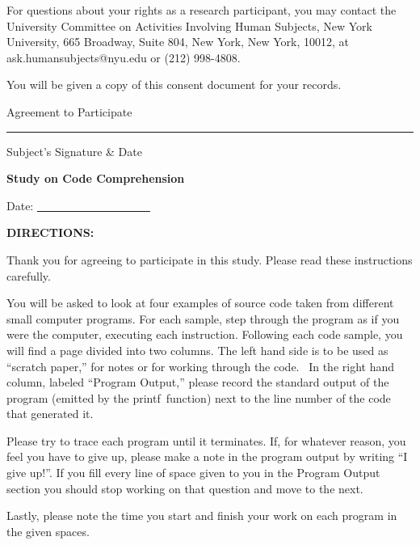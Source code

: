 \documentclass[12pt, a4paper, oneside]{article}
\begin{document}
For questions about your rights as a research participant, you may
contact the University Committee on Activities Involving Human Subjects,
New York University, 665 Broadway, Suite 804, New York, New York, 10012,
at ask.humansubjects@nyu.edu or (212) 998-4808.

You will be given a copy of this consent document for your records.

\vspace{20pt}

Agreement to Participate

\vspace{20pt}

\rule{0.7\linewidth}{\linethickness}

Subject's Signature \& Date

\pagebreak

\begin{center}\textbf{Study on Code Comprehension}\end{center}

\vspace{20pt}

Date: \underline{~~~~~~~~~~~~~~~~~~~~}

\vspace{20pt}

\textbf{DIRECTIONS:}

{Thank you for agreeing to participate in this study. Please read these
instructions carefully.}

{You will be asked to look at four examples of source code taken from
different small computer programs. For each sample, }{step through the
program as if you were the computer, executing each instruction.
Following each code sample, you will find a page divided into two
columns. The left hand side is to be used as ``scratch paper,'' for
notes or for working through the code. ~In the right hand column,
labeled ``Program Output,'' please record the standard output of the
program (emitted by the }{printf}{~function) next to the line number of
the code that generated it.}

Please try to trace each program until it terminates. If, for whatever reason, you feel you have to give up, please make a note in the program output by writing “I give up!”. If you fill every line of space given to you in the Program Output section you should stop working on that question and move to the next.

Lastly, please note the time you start and finish your work on each program in the given spaces.
\end{document}
